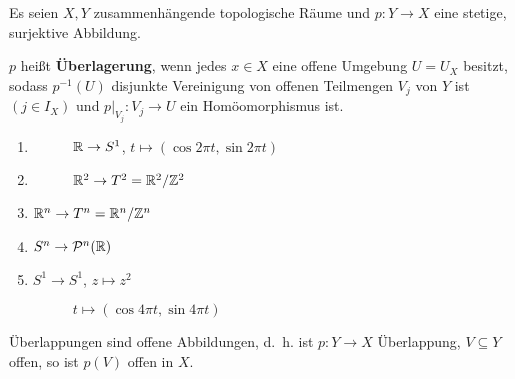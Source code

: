 \begin{definition}\label{def:12.1}%
    Es seien $X, Y$ zusammenhängende topologische Räume und
    $p: Y \rightarrow X$ eine stetige, surjektive Abbildung.

    $p$ heißt \textbf{Überlagerung}, wenn jedes $x \in X$ eine offene
    Umgebung $U = U_X$ besitzt, sodass $p^{-1}(U)$ disjunkte Vereinigung
    von offenen Teilmengen $V_j$ von $Y$ ist $(j \in I_X)$ und
    $p|_{V_j}: V_j \rightarrow U$ ein Homöomorphismus ist.
\end{definition}

\begin{beispiel}
    \begin{enumerate}[label=\arabic*)]
        \item 
            \begin{figure}
                \centering
                
                \caption{$\mathbb{R} \rightarrow S^1$, $t \mapsto (\cos 2 \pi t, \sin 2 \pi t)$}
                \label{fig:ueberlappung-r1-spirale-s1}
            \end{figure}
        \item 
            \begin{figure}
                \centering
                
                \caption{$\mathbb{R}^2 \rightarrow T^2 = \mathbb{R}^2 / \mathbb{Z}^2$}
                \label{fig:ueberlappung-kaestchen-torus}
            \end{figure}
        \item $\mathbb{R}^n \rightarrow T^n = \mathbb{R}^n / \mathbb{Z}^n$
        \item $S^n \rightarrow \mathcal{P}^n(\mathbb{R})$
        \item $S^1 \rightarrow S^1$, $z \mapsto z^2$
            \begin{figure}
                \centering
                
                \caption{$t \mapsto (\cos 4 \pi t, \sin 4 \pi t)$}
                \label{fig:ueberlappung-kaestchen-torus}
            \end{figure}
    \end{enumerate}
\end{beispiel}

\begin{korollar} %
    Überlappungen sind offene Abbildungen, d.~h. ist $p:Y \rightarrow X$
    Überlappung, $V \subseteq Y$ offen, so ist $p(V)$ offen in $X$.
\end{korollar}

